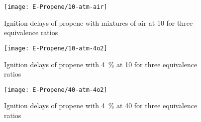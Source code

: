 \documentclass[../main.tex]{subfiles}
\begin{document}
\begin{figure}
    \begin{floatrow}
        \ffigbox
            {\texttt{[image: E-Propene/10-atm-air]}}
            {\caption{Ignition delays of propene with mixtures of air at
            \SI{10}{\atmosphere} for three equivalence ratios}
            \label{fig:10-atm-air}}
    \end{floatrow}
\end{figure}

\begin{figure}
    \begin{floatrow}
        \ffigbox
            {\texttt{[image: E-Propene/10-atm-4o2]}}
            {\caption{Ignition delays of propene with \SI{4}{\percent}
             at \SI{10}{\atmosphere} for three equivalence ratios}
            \label{fig:10-atm-4o2}}
        \ffigbox
            {\texttt{[image: E-Propene/40-atm-4o2]}}
            {\caption{Ignition delays of propene with \SI{4}{\percent}
             at \SI{40}{\atmosphere} for three equivalence ratios}
            \label{fig:40-atm-4o2}}
    \end{floatrow}
\end{figure}
\end{document}
